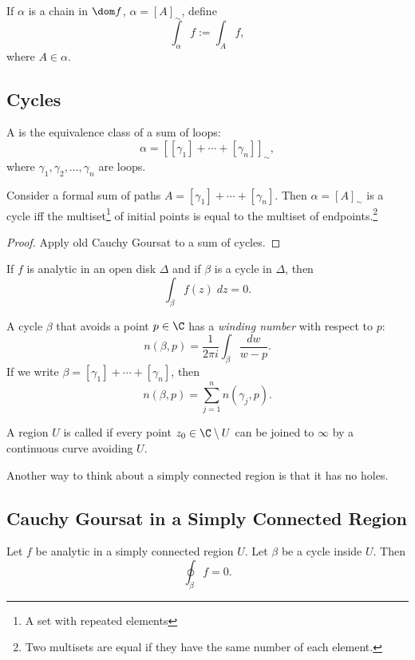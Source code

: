 \begin{definition}
    If $\alpha$ is a chain in $\dom f$, $\alpha = {[A]}_{\sim}$,
    define
    \[ \int_{\alpha} f := \int_A f, \]
    where $A \in \alpha$.
\end{definition}

\subsection{Cycles}
\begin{definition}
    A  is the equivalence class of a sum of loops:
    \[ \alpha = {[ [\gamma_1] + \cdots + [\gamma_n]]}_{\sim}, \]
    where $\gamma_1, \gamma_2, \ldots, \gamma_n$ are loops.
\end{definition}

\begin{theorem}
    Consider a formal sum of paths $A = [\gamma_1] + \cdots + 
    [\gamma_n]$.
    Then $\alpha = {[A]}_{\sim}$ is a cycle iff the multiset\footnote{A set with repeated elements} of initial points is equal
    to the multiset of endpoints.\footnote{Two multisets are 
    equal if they have the same number of each element.}
\end{theorem}

\begin{proof}
    Apply old Cauchy Goursat to a sum of cycles.
\end{proof}
 
\begin{theorem}
    If $f$ is analytic in an open disk $\Delta$ and if $\beta$
    is a cycle in $\Delta$, then
    \[ \int_{\beta} f(z) \; dz = 0. \]
\end{theorem}
A cycle $\beta$ that avoids a point $p \in \C$ has a 
\textit{winding number} with respect to $p$:
\[ n(\beta, p) = \frac{1}{2\pi i}\int_{\beta} \frac{dw}{w-p}.\]
If we write $\beta = [\gamma_1] + \cdots + [\gamma_n]$, then
\[ n(\beta, p) = \sum_{j=1}^n n(\gamma_j, p). \]

\begin{definition}
    A region $U$ is called  if every point
    $z_0 \in \C \setminus U$ can be joined to $\infty$ by a
    continuous curve avoiding $U$.
\end{definition}

Another way to think about a simply connected region is that
it has no holes.

\subsection{Cauchy Goursat in a Simply Connected Region}
\begin{theorem}
    Let $f$ be analytic in a simply connected region $U$.
    Let $\beta$ be a cycle inside $U$.
    Then 
    \[ \oint_{\beta} f = 0. \]
\end{theorem}

